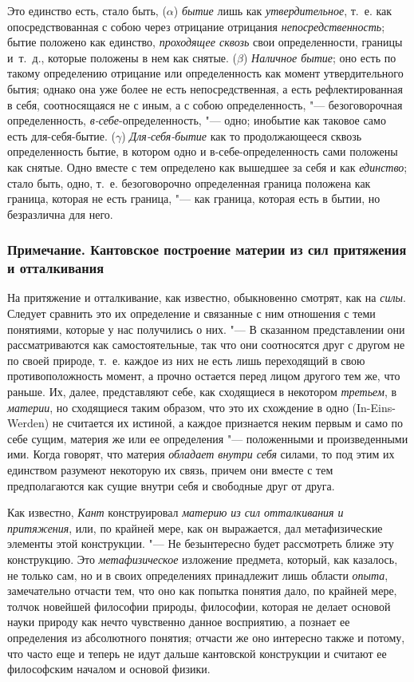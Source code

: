 Это единство есть, стало быть, ($\alpha $) {\em бытие}
лишь как {\em утвердительное}, т.~е. как
опосредствованная с собою через отрицание отрицания
{\em непосредственность}; бытие положено как единство,
{\em проходящее сквозь} свои определенности, границы
и~т.~д., которые положены в нем как снятые. ($\beta $)
{\em Наличное бытие}; оно есть по такому определению
отрицание или определенность как момент утвердительного бытия; однако она
уже более не есть непосредственная, а есть рефлектированная в себя,
соотносящаяся не с иным, а с собою определенность, "--- безоговорочная
определенность, {\em в-себе}{}-определенность, "--- одно;
инобытие как таковое само есть для-себя-бытие. ($\gamma $)
{\em Для-себя-бытие} как то продолжающееся сквозь
определенность бытие, в котором одно и в-себе-определенность сами положены
как снятые. Одно вместе с тем определено как вышедшее за себя и как
{\em единство}; стало быть, одно, т.~е. безоговорочно
определенная граница положена как граница, которая не есть граница, "--- как
граница, которая есть в бытии, но безразлична для него.


\subsubsection[Примечание. Кантовское построение материи из сил притяжения и отталкивания]
{Примечание. Кантовское построение материи из сил притяжения и отталкивания}

На притяжение и отталкивание, как известно, обыкновенно смотрят, как на
{\em силы}. Следует сравнить это их определение и
связанные с ним отношения с теми понятиями, которые у нас получились о них.
"--- В сказанном представлении они рассматриваются как самостоятельные, так
что они соотносятся друг с другом не по своей природе, т.~е. каждое из них
не есть лишь переходящий в свою противоположность момент, а прочно остается
перед лицом другого тем же, что раньше. Их, далее, представляют себе, как
сходящиеся в некотором {\em третьем}, в
{\em материи}, но сходящиеся таким образом, что это их
схождение в одно (In-Eins-Werden) не считается их истиной, а каждое
признается неким первым и само по себе сущим, материя же или ее
определения "--- положенными и произведенными ими. Когда говорят, что материя
{\em обладает внутри себя} силами, то под этим их
единством разумеют некоторую их связь, причем они вместе с тем
предполагаются как сущие внутри себя и свободные друг от друга.

Как известно, {\em Кант} конструировал
{\em материю из сил отталкивания и притяжения}, или, по
крайней мере, как он выражается, дал метафизические элементы этой
конструкции. "--- Не безынтересно будет рассмотреть ближе эту конструкцию. Это
{\em метафизическое} изложение предмета, который, как
казалось, не только сам, но и в своих определениях принадлежит лишь области
{\em опыта}, замечательно отчасти тем, что оно как
попытка понятия дало, по крайней мере, толчок новейшей философии природы,
философии, которая не делает основой науки природу как нечто чувственно
данное восприятию, а познает ее определения из абсолютного понятия; отчасти
же оно интересно также и потому, что часто еще и теперь не идут дальше
кантовской конструкции и считают ее философским началом и основой физики.

